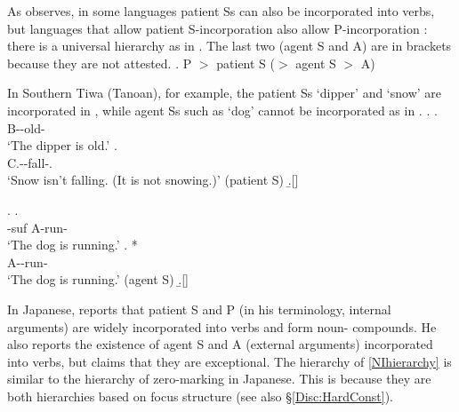 As  observes,
in some languages patient Ss can also be incorporated into verbs,
but languages that allow patient S-incorporation also allow P-incorporation \cite[see also][]{baker88}: %
there is a universal hierarchy as in \Next.
The last two (agent S and A) are in brackets because
they are not attested.
%
\ex. \label{NIhierarchy}P $>$ patient S ($>$ agent S $>$ A)

In Southern Tiwa (Tanoan), for example,
the patient Ss `dipper' and `snow' are incorporated in \Next,
while agent Ss such as `dog' cannot be incorporated as in \NNext.
	\ex. \ag.  \\
			{\sc B}--old- \\
			`The dipper is old.'
		\bg.  \\
			{\sc C}.--fall-. \\
			`Snow isn't falling. (It is not snowing.)'  \hfill{(patient S)}
		\b.[] \hfill{\cite{allenetal84,baker88}}
	
	\ex. \ag.   \\
			-{\sc suf} {\sc A}-run- \\
			`The dog is running.'
		\bg. * \\
			{\sc A}--run- \\
			`The dog is running.'
			\hfill{(agent S)}
		\b.[] \hfill{\cite{allenetal84,baker88}}

In Japanese,
 reports that
patient S and P (in his terminology, internal arguments) are widely incorporated into verbs and form noun- compounds.
He also reports the existence of agent S and A (external arguments) incorporated into verbs,
but claims that they are exceptional.
The hierarchy of  \ref{NIhierarchy} is similar to the hierarchy of zero-marking in Japanese.
This is because
they are both hierarchies based on focus structure (see also \S \ref{Disc:HardConst}).

